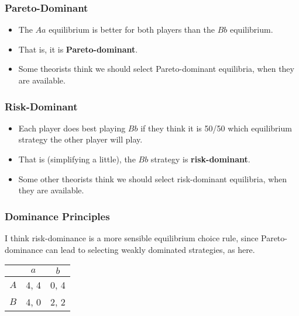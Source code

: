 \begin{frame}

\frametitle{Pareto-Dominant}
\label{pareto-dominant}

\begin{itemize}
\item The $Aa$ equilibrium is better for both players than the $Bb$ equilibrium.

\item That is, it is \textbf{Pareto-dominant}.

\item Some theorists think we should select Pareto-dominant equilibria, when they are available.

\end{itemize}

\end{frame}

\begin{frame}

\frametitle{Risk-Dominant}
\label{risk-dominant}

\begin{itemize}
\item Each player does best playing $Bb$ if they think it is 50\slash 50 which equilibrium strategy the other player will play.

\item That is (simplifying a little), the $Bb$ strategy is \textbf{risk-dominant}.

\item Some other theorists think we should select risk-dominant equilibria, when they are available.

\end{itemize}

\end{frame}

\begin{frame}

\frametitle{Dominance Principles}
\label{dominanceprinciples}

I think risk-dominance is a more sensible equilibrium choice rule, since Pareto-dominance can lead to selecting weakly dominated strategies, as here.


\begin{center}
\begin{tabular}{r | c c}
& $a$ & $b$ \\ \hline
$A$ & 4, 4 & 0, 4 \\
$B$ & 4, 0 & 2, 2
\end{tabular}
\end{center}


\end{frame}

